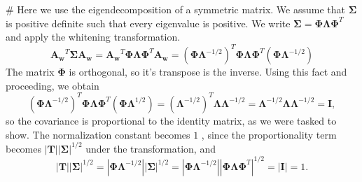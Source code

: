 \documentclass[12pt, a4paper]{article}
\newcommand{\vect}[1]{\bm{#1}}
\newcommand{\abs}[1]{\left\lvert#1\right\rvert}
\begin{document}
\begin{easylist}[enumerate]
# Here we use the eigendecomposition of a symmetric matrix.
We assume that $\vect{\Sigma}$ is positive definite such that every eigenvalue is positive. 
We write $\vect{\Sigma} = \vect{\Phi} \vect{\Lambda} \vect{\Phi}^T$ and apply the whitening transformation.
\begin{equation*}
	\vect{\vect{A}_w}^T \vect{\Sigma} \vect{\vect{A}_w} = 
	\vect{\vect{A}_w}^T \vect{\Phi} \vect{\Lambda} \vect{\Phi}^T \vect{\vect{A}_w}  = 
	\left( \vect{\Phi} \vect{\Lambda}^{-1/2} \right)^T \vect{\Phi} \vect{\Lambda} \vect{\Phi}^T \left( \vect{\Phi} \vect{\Lambda}^{-1/2} \right)
\end{equation*}
The matrix $\vect{\Phi}$ is orthogonal, so it's transpose is the inverse.
Using this fact and proceeding, we obtain
\begin{equation*}
\left( \vect{\Phi} \vect{\Lambda}^{-1/2} \right)^T \vect{\Phi} \vect{\Lambda} \vect{\Phi}^T \left( \vect{\Phi} \vect{\Lambda}^{1/2} \right) = \left( \vect{\Lambda}^{-1/2} \right)^T \vect{\Lambda} \vect{\Lambda}^{-1/2} = \vect{\Lambda}^{-1/2} \vect{\Lambda} \vect{\Lambda}^{-1/2} = \vect{I},
\end{equation*}
so the covariance is proportional to the identity matrix, as we were tasked to show.
The normalization constant becomes $1$ , since the proportionality term becomes $\abs{\vect{T}} \abs{\vect{\Sigma} }^{1/2}$ under the transformation, and 
\begin{equation*}
	\abs{\vect{T}} \abs{\vect{\Sigma} }^{1/2} = \abs{\vect{\Phi} \vect{\Lambda}^{-1/2}} \abs{\vect{\Sigma} }^{1/2} = \abs{\vect{\Phi} \vect{\Lambda}^{-1/2}} \abs{\vect{\Phi} \vect{\Lambda} \vect{\Phi}^T }^{1/2} = \abs{\vect{I}} = 1.
\end{equation*}
\end{easylist}
\end{document}
